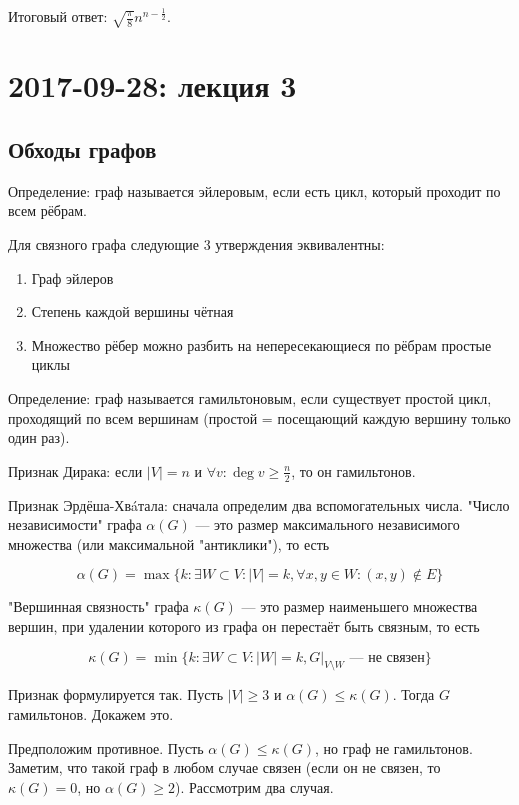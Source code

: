\documentclass[12pt]{article}
\begin{document}
Итоговый ответ: $\sqrt{\frac \pi 8} n^{n - \frac 1 2}$.

\section{2017-09-28: лекция 3}

\subsection{Обходы графов}

Определение: граф называется эйлеровым, если есть цикл, который проходит по всем рёбрам.

Для связного графа следующие 3 утверждения эквивалентны:

\begin{enumerate}
\item Граф эйлеров
\item Степень каждой вершины чётная
\item Множество рёбер можно разбить на непересекающиеся по рёбрам простые циклы
\end{enumerate}

Определение: граф называется гамильтоновым, если существует простой цикл, проходящий по всем вершинам (простой = посещающий каждую вершину только один раз).

Признак Дирака: если $|V| = n$ и $\forall v \colon \operatorname{deg} v \geq \frac n 2$, то он гамильтонов.

Признак Эрдёша-Хвáтала: сначала определим два вспомогательных числа. "Число независимости" графа $\alpha (G)$ — это размер максимального независимого множества (или максимальной "антиклики"), то есть

\[
\alpha(G) = \max \{ k \colon \exists W \subset V \colon |V| = k, \forall x, y \in W \colon (x, y) \not\in E \}
\]

"Вершинная связность" графа $\kappa (G)$ — это размер наименьшего множества вершин, при удалении которого из графа он перестаёт быть связным, то есть

\[
\kappa (G) = \min \{ k \colon \exists W \subset V \colon |W| = k, G|_{V \setminus W} \text{ — не связен} \}
\]

Признак формулируется так. Пусть $|V| \geq 3$ и $\alpha(G) \leq \kappa(G)$. Тогда $G$ гамильтонов. Докажем это.

Предположим противное. Пусть $\alpha(G) \leq \kappa(G)$, но граф не гамильтонов. Заметим, что такой граф в любом случае связен (если он не связен, то $\kappa(G) = 0$, но $\alpha(G) \geq 2$). Рассмотрим два случая.
\end{document}
